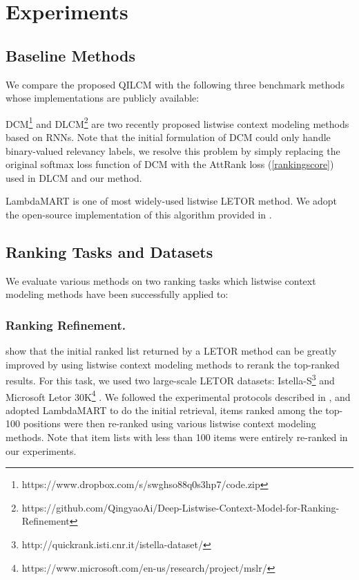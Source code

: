 \documentclass[letterpaper]{article}
\begin{document}
\section{Experiments}

\subsection{Baseline Methods}

We compare the proposed QILCM with the following three benchmark methods whose implementations are publicly available:

DCM\footnote{https://www.dropbox.com/s/swghso88q0s3hp7/code.zip} \cite{DCM} and  DLCM\footnote{https://github.com/QingyaoAi/Deep-Listwise-Context-Model-for-Ranking-Refinement} \cite{ai2018learning} are two recently proposed listwise context modeling methods based on RNNs. Note that the initial formulation of DCM could only handle binary-valued relevancy labels, we resolve this problem by simply replacing the original softmax loss function of DCM with the AttRank loss (\ref{rankingscore}) used in DLCM and our method.

LambdaMART \cite{000278621400005} is one of most widely-used listwise LETOR method. We adopt the open-source implementation of this algorithm provided in \cite{capannini2016quality}.

\subsection{Ranking Tasks and Datasets}

We evaluate various methods on two ranking tasks which listwise context modeling methods have been successfully applied to:
\subsubsection{Ranking Refinement.} \cite{ai2018learning} show that the initial ranked list returned by a LETOR method can be greatly improved by using listwise context modeling methods to rerank the top-ranked results. For this task, we used two large-scale LETOR datasets: Istella-S\footnote{http://quickrank.isti.cnr.it/istella-dataset/} \cite{istella} and Microsoft Letor 30K\footnote{https://www.microsoft.com/en-us/research/project/mslr/} \cite{qin2013introducing}. We followed the experimental protocols described in \cite{ai2018learning}, and adopted LambdaMART to do the initial retrieval, items ranked among the top-100 positions were then re-ranked using various listwise context modeling methods. Note that item lists with less than 100 items were entirely re-ranked in our experiments.
\end{document}
